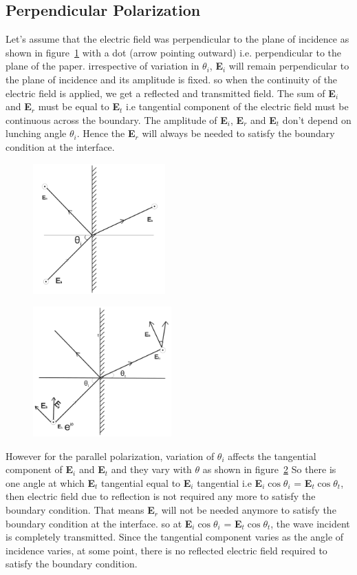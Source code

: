 \subsection{Perpendicular Polarization}
Let's assume that the electric field was perpendicular to the plane of incidence as shown in figure~\ref{fig:mcben1} with a dot (arrow pointing outward) i.e. perpendicular to the plane of the paper. irrespective of variation in $\theta_i$, \textbf{E}$_i$ will remain perpendicular to the plane of incidence and its amplitude is fixed. so when the continuity of the electric field is applied, we get a reflected and transmitted field. The sum of \textbf{E}$_i$ and \textbf{E}$_r$ must be equal to \textbf{E}$_t$ i.e tangential component of the electric field must be continuous across the boundary. The amplitude of \textbf{E}$_i$, \textbf{E}$_r$ and \textbf{E}$_t$ don't depend on lunching angle $\theta_i$. Hence the \textbf{E}$_r$ will always be needed to satisfy the boundary condition at the interface.
\begin{figure}[h]
\centering
\includegraphics[height=5cm]{./graphics/mcben1}
\caption{}
\label{fig:mcben1}
\end{figure}
\begin{figure}[h]
\centering
\includegraphics[height=5cm]{./graphics/mcben2}
\caption{}
\label{fig:mcben2}
\end{figure}	

However for the parallel polarization, variation of $\theta_i$ affects the tangential component of \textbf{E}$_i$ and \textbf{E}$_t$ and they vary with $\theta$ as shown in figure~\ref{fig:mcben2} So there is one angle at which \textbf{E}$_t$ tangential equal to \textbf{E}$_i$ tangential i.e \textbf{E}$_i\cos\theta_i$ = \textbf{E}$_t\cos\theta_t$, then electric field due to reflection is not required any more to satisfy the boundary condition. That means \textbf{E}$_r$ will not be needed anymore to satisfy the boundary condition at the interface. so at \textbf{E}$_i\cos\theta_i$ = \textbf{E}$_t\cos\theta_t$, the wave incident is completely transmitted. Since the tangential component varies as the angle of incidence varies, at some point, there is no reflected electric field required to satisfy the boundary condition.

